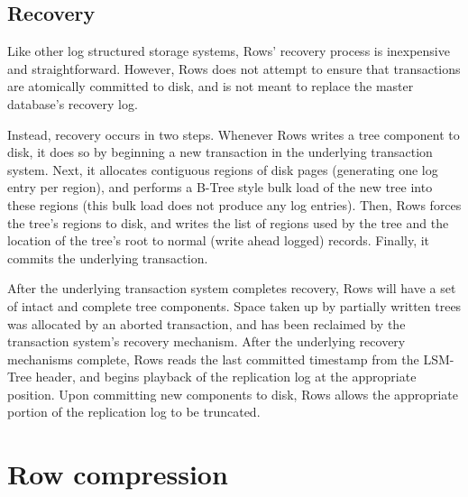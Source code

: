 \documentclass{sig-alternate-sigmod08}
\newcommand{\rows}{Rows\xspace}
\newcommand{\rowss}{Rows'\xspace}
\begin{document}

\subsection{Recovery}

Like other log structured storage systems, \rowss recovery process is
inexpensive and straightforward.  However, \rows does not attempt to
ensure that transactions are atomically committed to disk, and is not
meant to replace the master database's recovery log.

Instead, recovery occurs in two steps.  Whenever \rows writes a tree
component to disk, it does so by beginning a new transaction in the
underlying transaction system.  Next, it allocates
contiguous regions of disk pages (generating one log entry per
region), and performs a B-Tree style bulk load of the new tree into
these regions (this bulk load does not produce any log entries).
Then, \rows forces the tree's regions to disk, and writes the list
of regions used by the tree and the location of the tree's root to
normal (write ahead logged) records.  Finally, it commits the
underlying transaction.

After the underlying transaction system completes recovery, \rows
will have a set of intact and complete tree components.  Space taken
up by partially written trees was allocated by an aborted
transaction, and has been reclaimed by the transaction system's
recovery mechanism.  After the underlying recovery mechanisms
complete, \rows reads the last committed timestamp from the LSM-Tree
header, and begins playback of the replication log at the appropriate
position.  Upon committing new components to disk, \rows allows the
appropriate portion of the replication log to be truncated.

\section{Row compression}
\end{document}
